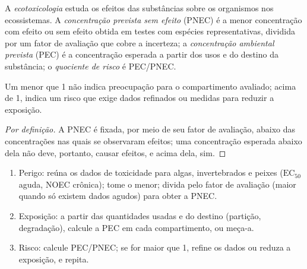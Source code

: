 \begin{definition}[Ecotoxicologia]\label{def:b3:environmental-toxicology:ecotoxicology}
A \emph{ecotoxicologia} estuda os efeitos das substâncias sobre os
organismos nos ecossistemas. A \emph{concentração prevista sem
efeito} (PNEC) é a menor
concentração com efeito ou sem efeito obtida em testes com espécies representativas,
dividida por um fator de avaliação que cobre a incerteza; a
\emph{concentração ambiental prevista}
(PEC) é a concentração esperada a partir dos usos e do destino da
substância; o \emph{quociente de risco} é PEC/PNEC.
\end{definition}

\begin{proposition}\label{prop:b3:environmental-toxicology:risk-quotient}
Um  menor que 1 não indica preocupação para o compartimento avaliado; acima
de 1, indica um risco que exige dados refinados ou medidas para reduzir a exposição.
\end{proposition}

\begin{proof}[Por definição]
A PNEC é fixada, por meio de seu fator de avaliação, abaixo das concentrações nas quais
se observaram efeitos; uma concentração esperada abaixo dela não deve, portanto,
causar efeitos, e acima dela, sim.
\end{proof}

\begin{method}\label{met:b3:environmental-toxicology:risk}
\begin{enumerate}
  \item Perigo: reúna os dados de toxicidade para algas, invertebrados e peixes ($\mathrm{EC_{50}}$
        aguda, NOEC crônica); tome o menor; divida pelo fator de avaliação (maior quando
        só existem dados agudos) para obter a PNEC.
  \item Exposição: a partir das quantidades usadas e do destino (partição, degradação),
        calcule a PEC em cada compartimento, ou meça-a.
  \item Risco: calcule PEC/PNEC; se for maior que 1, refine os dados ou reduza a
        exposição, e repita.
\end{enumerate}
\end{method}

